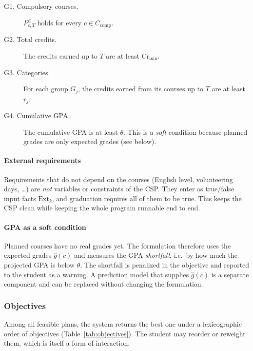 \begin{description}
  \item[G1. Compulsory courses.] $P^{\le}_{c,T}$ holds for every $c\in C_{\mathrm{comp}}$.
  \item[G2. Total credits.] The credits earned up to $T$ are at least $\mathrm{Cr}_{\min}$.
  \item[G3. Categories.] For each group $G_j$, the credits earned from its
        courses up to $T$ are at least $r_j$.
  \item[G4. Cumulative GPA.] The cumulative GPA is at least $\theta$.
        This is a \emph{soft} condition because planned grades are only
        expected grades (see below).
\end{description}

\paragraph{External requirements}
Requirements that do not depend on the courses (English level, volunteering
days, \dots) are \emph{not} variables or constraints of the CSP. They enter
as true/false input facts $\mathrm{Ext}_k$, and graduation requires all of
them to be true. This keeps the CSP clean while keeping the whole program
runnable end to end.

\paragraph{GPA as a soft condition}
Planned courses have no real grades yet. The formulation therefore uses the
expected grades $\hat g(c)$ and measures the GPA \emph{shortfall}, i.e.\ by how
much the projected GPA is below $\theta$. The shortfall is penalized in the
objective and reported to the student as a warning. A prediction model that
supplies $\hat g(c)$ is a separate component and can be replaced without
changing the formulation.

\subsubsection{Objectives}\label{sec:objectives}

Among all feasible plans, the system returns the best one under a
lexicographic order of objectives (Table~\ref{tab:objectives}). The student
may reorder or reweight them, which is itself a form of interaction.

